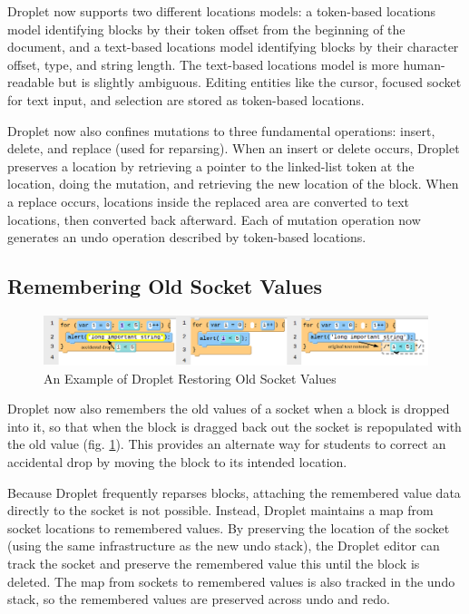 \documentclass[conference]{IEEEtran}
\begin{document}
Droplet now supports two different locations models: a token-based locations model identifying blocks by their token offset from the beginning of the document, and a text-based locations model identifying blocks by their character offset, type, and string length. The text-based locations model is more human-readable but is slightly ambiguous. Editing entities like the cursor, focused socket for text input, and selection are stored as token-based locations.

Droplet now also confines mutations to three fundamental operations: insert, delete, and replace (used for reparsing). When an insert or delete occurs, Droplet preserves a location by retrieving a pointer to the linked-list token at the location, doing the mutation, and retrieving the new location of the block. When a replace occurs, locations inside the replaced area are converted to text locations, then converted back afterward. Each of mutation operation now generates an undo operation described by token-based locations.

\subsection{Remembering Old Socket Values}

\begin{figure}
\centering
\includegraphics[width=5in]{remember-socket.png}
\caption{An Example of Droplet Restoring Old Socket Values}
\label{remember-socket}
\end{figure}

Droplet now also remembers the old values of a socket when a block is dropped into it, so that when the block is dragged back out the socket is repopulated with the old value (fig. \ref{remember-socket}). This provides an alternate way for students to correct an accidental drop by moving the block to its intended location.

Because Droplet frequently reparses blocks, attaching the remembered value data directly to the socket is not possible. Instead, Droplet maintains a map from socket locations to remembered values. By preserving the location of the socket (using the same infrastructure as the new undo stack), the Droplet editor can track the socket and preserve the remembered value this until the block is deleted. The map from sockets to remembered values is also tracked in the undo stack, so the remembered values are preserved across undo and redo.
\end{document}
